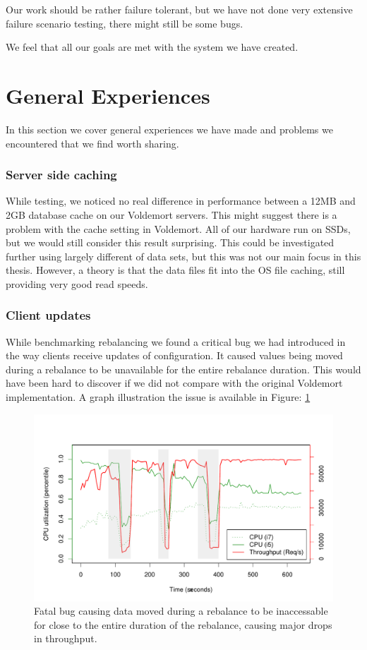 Our work should be rather failure tolerant, but we have not done very extensive failure scenario testing, there might still be some bugs. 

We feel that all our goals are met with the system we have created.

\section{General Experiences}
\label{eval:exp}
In this section we cover general experiences we have made and problems we encountered that we find worth sharing. 

\subsubsection{Server side caching}
While testing, we noticed no real difference in performance between a 12MB and 2GB database cache on our Voldemort servers. This might suggest there is a problem with the cache setting in Voldemort. All of our hardware run on SSDs, but we would still consider this result surprising. This could be investigated further using largely different of data sets, but this was not our main focus in this thesis. However, a theory is that the data files fit into the OS file caching, still providing very good read speeds.

\subsubsection{Client updates}
While benchmarking rebalancing we found a critical bug we had introduced in the way clients receive updates of configuration. It caused values being moved during a rebalance to be unavailable for the entire rebalance duration. This would have been hard to discover if we did not compare with the original Voldemort implementation. A graph illustration the issue is available in Figure: \ref{fig:adaptive_bug}

\begin{figure}[h]
    \centering
    \includegraphics[width=1.0\textwidth]{results/throughput/adaptive/zookeeper/auto_2nodes_error}
    \caption{Fatal bug causing data moved during a rebalance to be inaccessable for close to the entire duration of the rebalance, causing major drops in throughput.}
    \label{fig:adaptive_bug}
\end{figure}

